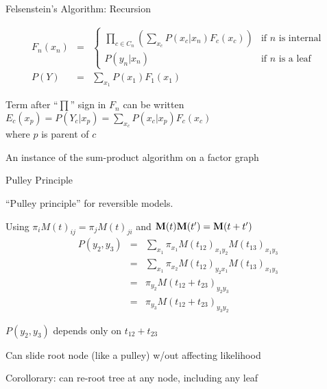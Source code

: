 \documentclass{beamer}
\begin{document}
\begin{frame}{Felsenstein's Algorithm: Recursion}

\begin{eqnarray*}
F_n(x_n) & = & \left\{ \begin{array}{ll} \displaystyle
\prod_{\mbox{$c \in C_n$}} \left( \sum_{x_c} P(x_c|x_n) F_c(x_c) \right) & \mbox{if $n$ is internal} \\
P(y_n|x_n) & \mbox{if $n$ is a leaf}
\end{array} \right. \\
P(Y) & = & \sum_{x_1} P(x_1) F_1(x_1)
\end{eqnarray*}

\itemb
  \item Term after ``$\prod$'' sign in $F_n$ can be written $E_c(x_p) = P(Y_c|x_p) = \sum_{x_c} P(x_c|x_p) F_c(x_c)$ \\ where $p$ is parent of $c$
  \item An instance of the \alert{sum-product algorithm} on a factor graph
\iteme

\end{frame}

\begin{frame}{Pulley Principle}

\itemb
\item ``Pulley principle'' for reversible models. %
\Tree [ .1 2 3 ]
 \itemb
 \item Using $\pi_i M(t)_{ij} = \pi_j M(t)_{ji}$ and ${\bf M}(t){\bf M}(t')={\bf M}(t+t')$
\begin{eqnarray*}
P(y_2,y_3) & = & \sum_{x_1} \pi_{x_1} M(t_{12})_{x_1 y_2} M(t_{13})_{x_1 y_3} \\
& = & \sum_{x_1} \pi_{x_2} M(t_{12})_{y_2 x_1} M(t_{13})_{x_1 y_3} \\
& = & \pi_{y_2} M(t_{12}+t_{23})_{y_2 y_3} \\
& = & \pi_{y_3} M(t_{12}+t_{23})_{y_3 y_2}
\end{eqnarray*}
 \item $P(y_2,y_3)$ depends only on $t_{12}+t_{23}$
 \item Can slide root node (like a pulley) w/out affecting likelihood 
 \item Corollorary: can re-root tree at any node, including any leaf
 \iteme
\iteme

\end{frame}
\end{document}
